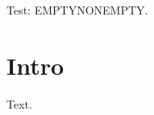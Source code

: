 \documentclass{article}
\title{}
\makeatletter
\def\mytest{\ifx\@title\@empty EMPTY\else NONEMPTY\fi}
\makeatother
\begin{document}
Test: \mytest.
\section{Intro}
Text.
\end{document}
